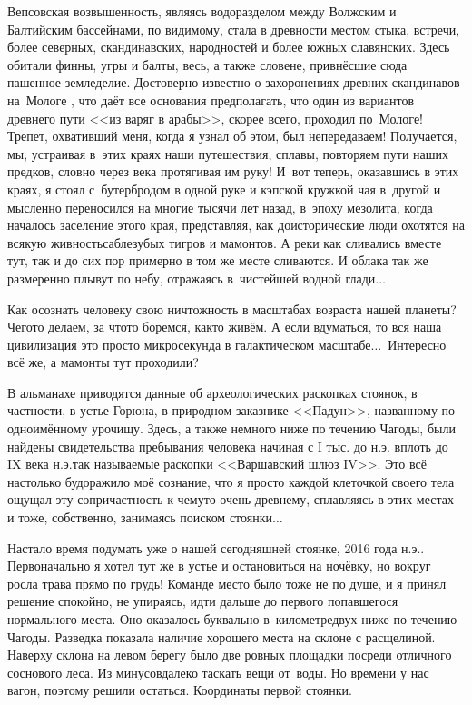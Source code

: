 Вепсовская возвышенность, являясь водоразделом между Волжским и Балтийским бассейнами, по видимому, стала в древности местом стыка, встречи, более северных, скандинавских, народностей и более южных славянских. Здесь обитали финны, угры и балты, весь, а также словене, привнёсшие сюда пашенное земледелие. Достоверно известно о захоронениях древних скандинавов на~Мологе \cite{БашенькинМологоШекснинскоеМеждуречье}, что даёт все основания предполагать, что один из вариантов древнего пути <<из варяг в арабы>>, скорее всего, проходил по~Мологе! Трепет, охвативший меня, когда я узнал об этом, был непередаваем! Получается, мы, устраивая в~этих краях наши путешествия, сплавы, повторяем пути наших предков, словно через века протягивая им руку!
\newpage
И~вот теперь, оказавшись в этих краях, я стоял с~бутербродом в одной руке и кэпской кружкой чая в~другой и мысленно переносился на многие тысячи лет назад, в~эпоху мезолита, когда началось заселение этого края, представляя, как доисторические люди охотятся на всякую живность\mdash саблезубых тигров и мамонтов. А реки как сливались вместе тут, так и до сих пор примерно в том же месте сливаются. И облака так же размеренно плывут по небу, отражаясь в~чистейшей водной глади$\ldots$

Как осознать человеку свою ничтожность в масштабах возраста нашей планеты? Чего\sdash то делаем, за что\sdash то боремся, как\sdash то живём. А если вдуматься, то вся наша цивилизация \mdash это просто микросекунда в галактическом масштабе$\ldots$~Интересно всё же, а мамонты тут проходили?

В альманахе \cite{ЧагодаАльманахБашенькин} приводятся данные об археологических раскопках стоянок, в частности, в устье Горюна, в природном заказнике <<Падун>>, названному по одноимённому урочищу. Здесь, а также немного ниже по течению Чагоды, были найдены свидетельства пребывания человека начиная с I тыс. до н.э. вплоть до IX века н.э.\mdash так называемые раскопки <<Варшавский шлюз I\nbdash V>>. Это всё настолько будоражило моё сознание, что я просто каждой клеточкой своего тела ощущал эту сопричастность к чему\sdash то очень древнему, сплавляясь в этих местах и тоже, собственно, занимаясь поиском стоянки$\ldots$

Настало время подумать уже о нашей сегодняшней стоянке, 2016 года н.э.. Первоначально я хотел тут же в устье и остановиться на ночёвку, но вокруг росла трава прямо по грудь! Команде место было тоже не по душе, и я принял решение спокойно, не упираясь, идти дальше до первого попавшегося нормального места. Оно оказалось буквально в~километре\sdash двух ниже по течению Чагоды. Разведка показала наличие хорошего места на склоне с расщелиной. Наверху склона на левом берегу было две ровных площадки посреди отличного соснового леса. Из минусов\mdash далеко таскать вещи от~воды. Но времени у нас вагон, поэтому решили остаться. Координаты первой стоянки\mdash \CoordsChagodaSixteenFirst.

